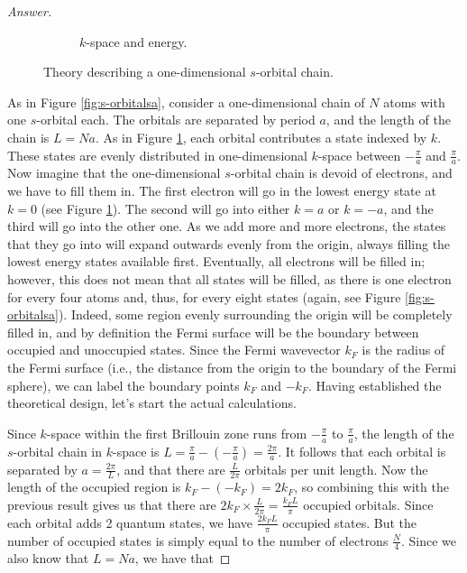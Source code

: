 \documentclass[../psets.tex]{subfiles}
\begin{document}
\begin{enumerate}[label={\Roman*)}]
\begin{enumerate}[label={\alph*.}]
\begin{proof}[Answer]
\begin{figure}[H]
\begin{subfigure}[b]{0.8\linewidth}
                    \caption{$k$-space and energy.}
                    \label{fig:s-orbitalsb}
                \end{subfigure}
                \caption{Theory describing a one-dimensional $s$-orbital chain.}
                \label{fig:s-orbitals}
            \end{figure}
            As in Figure \ref{fig:s-orbitalsa}, consider a one-dimensional chain of $N$ atoms with one $s$-orbital each. The orbitals are separated by period $a$, and the length of the chain is $L=Na$. As in Figure \ref{fig:s-orbitalsb}, each orbital contributes a state indexed by $k$. These states are evenly distributed in one-dimensional $k$-space between $-\frac{\pi}{a}$ and $\frac{\pi}{a}$. Now imagine that the one-dimensional $s$-orbital chain is devoid of electrons, and we have to fill them in. The first electron will go in the lowest energy state at $k=0$ (see Figure \ref{fig:s-orbitalsb}). The second will go into either $k=a$ or $k=-a$, and the third will go into the other one. As we add more and more electrons, the states that they go into will expand outwards evenly from the origin, always filling the lowest energy states available first. Eventually, all electrons will be filled in; however, this does not mean that all states will be filled, as there is one electron for every four atoms and, thus, for every eight states (again, see Figure \ref{fig:s-orbitalsa}). Indeed, some region evenly surrounding the origin will be completely filled in, and by definition the Fermi surface will be the boundary between occupied and unoccupied states. Since the Fermi wavevector $k_F$ is the radius of the Fermi surface (i.e., the distance from the origin to the boundary of the Fermi sphere), we can label the boundary points $k_F$ and $-k_F$. Having established the theoretical design, let's start the actual calculations.\par
            Since $k$-space within the first Brillouin zone runs from $-\frac{\pi}{a}$ to $\frac{\pi}{a}$, the length of the $s$-orbital chain in $k$-space is $L=\frac{\pi}{a}-(-\frac{\pi}{a})=\frac{2\pi}{a}$. It follows that each orbital is separated by $a=\frac{2\pi}{L}$, and that there are $\frac{L}{2\pi}$ orbitals per unit length. Now the length of the occupied region is $k_F-(-k_F)=2k_F$, so combining this with the previous result gives us that there are $2k_F\times\frac{L}{2\pi}=\frac{k_FL}{\pi}$ occupied orbitals. Since each orbital adds 2 quantum states, we have $\frac{2k_FL}{\pi}$ occupied states. But the number of occupied states is simply equal to the number of electrons $\frac{N}{4}$. Since we also know that $L=Na$, we have that

\end{proof}
\end{enumerate}
\end{enumerate}
\end{document}
